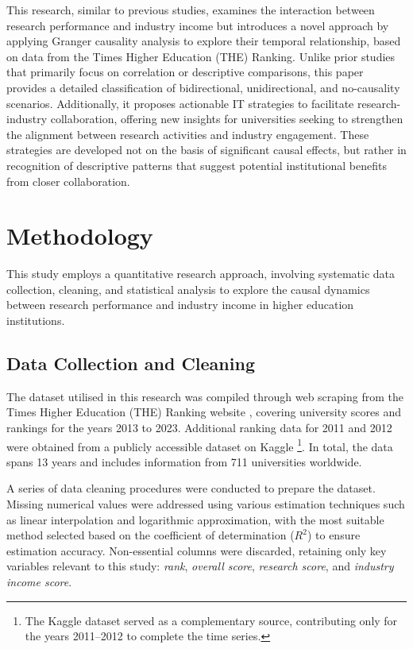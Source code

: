 \documentclass[a4paper, conference]{IEEEtran}
\begin{document}
This research, similar to previous studies, examines the interaction between research performance and industry income but introduces a novel approach by applying Granger causality analysis to explore their temporal relationship, based on data from the Times Higher Education (THE) Ranking. Unlike prior studies that primarily focus on correlation or descriptive comparisons, this paper provides a detailed classification of bidirectional, unidirectional, and no-causality scenarios. Additionally, it proposes actionable IT strategies to facilitate research-industry collaboration, offering new insights for universities seeking to strengthen the alignment between research activities and industry engagement. These strategies are developed not on the basis of significant causal effects, but rather in recognition of descriptive patterns that suggest potential institutional benefits from closer collaboration.


\section{Methodology}
\label{sec:methodology}

This study employs a quantitative research approach, involving systematic data collection, cleaning, and statistical analysis to explore the causal dynamics between research performance and industry income in higher education institutions.

\subsection{Data Collection and Cleaning}

The dataset utilised in this research was compiled through web scraping from the Times Higher Education (THE) Ranking website \cite{the2024}, covering university scores and rankings for the years 2013 to 2023. Additional ranking data for 2011 and 2012 were obtained from a publicly accessible dataset on Kaggle \cite{ONeil_2020}\footnote{The Kaggle dataset served as a complementary source, contributing only for the years 2011--2012 to complete the time series.}. In total, the data spans 13 years and includes information from 711 universities worldwide.

A series of data cleaning procedures were conducted to prepare the dataset. Missing numerical values were addressed using various estimation techniques such as linear interpolation and logarithmic approximation, with the most suitable method selected based on the coefficient of determination ($R^{2}$) to ensure estimation accuracy. Non-essential columns were discarded, retaining only key variables relevant to this study: \textit{rank}, \textit{overall score}, \textit{research score}, and \textit{industry income score}.
\end{document}
